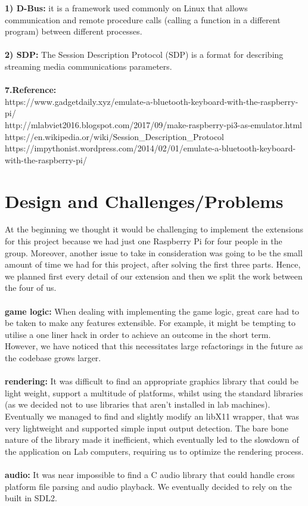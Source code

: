 \documentclass[a4paper]{article}
\begin{document}
\textbf{1) D-Bus:} it is a framework used commonly on Linux that allows communication and remote procedure calls (calling a function in a different program) between different processes. \\\\
\textbf{2) SDP:} The Session Description Protocol (SDP) is a format for describing streaming media communications parameters. 
\\\\
\textbf{7.Reference:}\\
https://www.gadgetdaily.xyz/emulate-a-bluetooth-keyboard-with-the-raspberry-pi/\\
http://mlabviet2016.blogspot.com/2017/09/make-raspberry-pi3-as-emulator.html\\
https://en.wikipedia.or/wiki/Session\_Description\_Protocol\\
https://impythonist.wordpress.com/2014/02/01/emulate-a-bluetooth-keyboard-with-the-raspberry-pi/
\section{Design and Challenges/Problems}
At the beginning we thought it would be challenging to implement the extensions for this project because we had just one Raspberry Pi for four people in the group. 
Moreover, another issue to take in consideration was going to be the small amount of time we had for this project, after solving the first three parts. Hence, we planned first every detail of our extension and then we split the work between the four of us.
\\\\
\textbf{game logic:} When dealing with implementing the game logic, great care had to be taken to make any features extensible. For example, it might be tempting to utilise a one liner hack in order to achieve an outcome in the short term. However, we have noticed that this necessitates large refactorings in the future as the codebase grows larger.
\\\\
\textbf{rendering:} It was difficult to find an appropriate graphics library that could be light weight, support a multitude of platforms, whilst using the standard libraries (as we decided not to use libraries that aren't installed in lab machines). Eventually we managed to find and slightly modify an libX11 wrapper, that was very lightweight and supported simple input output detection. The bare bone nature of the library made it inefficient, which eventually led to the slowdown of the application on Lab computers, requiring us to optimize the rendering process. 
\\\\
\textbf{audio:} It was near impossible to find a C audio library that could handle cross platform file parsing and audio playback. We eventually decided to rely on the built in SDL2.
\end{document}
